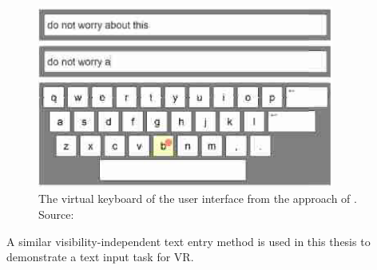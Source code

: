 \begin{figure}[H]%
	\centering%
	\includegraphics[height=6cm]{figures/related_work/markussen_2013_keyboard.png}%
  \caption[Virtual keyboard implementation by Markussen et al.]{
  The virtual keyboard of the user interface from the approach of \citeauthor{Markussen.2013}.
  \newline{}
  Source:~\cite[Figure 5]{Markussen.2013}}\label{fig:markussen-2013}
\end{figure}

A similar visibility-independent text entry method is used in this thesis to demonstrate a text input task for \gls{VR}.
